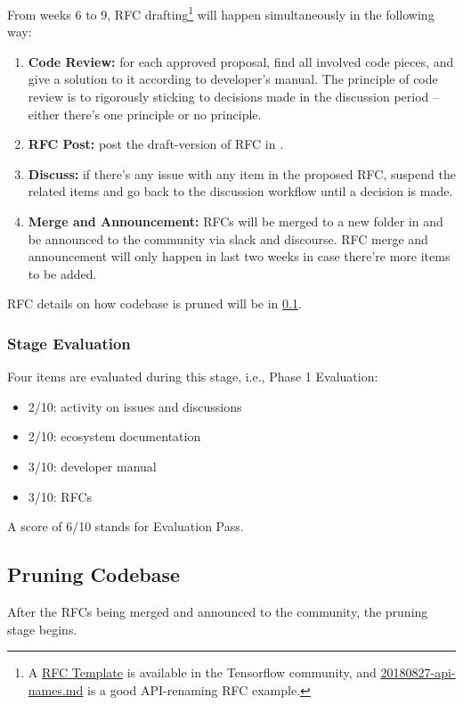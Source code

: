 From weeks 6 to 9, RFC drafting\footnote{A \href{https://github.com/tensorflow/community/blob/master/rfcs/yyyymmdd-rfc-template.md}{RFC Template} is available in the Tensorflow community, and \href{https://github.com/tensorflow/community/blob/master/rfcs/20180827-api-names.md}{20180827-api-names.md} is a good API-renaming RFC example.} will happen simultaneously in the following way:
\begin{enumerate}
    \item \textbf{Code Review:} for each approved proposal, find all involved code pieces, and give a solution to it according to developer's manual. The principle of code review is to rigorously sticking to decisions made in the discussion period -- either there's one principle or no principle.
    \item \textbf{RFC Post:} post the draft-version of RFC in \repogsoctempdoc{}.
    \item \textbf{Discuss:} if there's any issue with any item in the proposed RFC, suspend the related items and go back to the discussion workflow until a decision is made.
    \item \textbf{Merge and Announcement:} RFCs will be merged to a new folder in \repoimagesgithubio{} and be announced to the community via slack and discourse. RFC merge and announcement will only happen in last two weeks in case there're more items to be added.
\end{enumerate}
RFC details on how codebase is pruned will be in \cref{subsec:prune}.

\subsubsection*{Stage Evaluation}

Four items are evaluated during this stage, i.e., \textsf{Phase 1 Evaluation}:
\begin{itemize}
    \item 2/10: activity on issues and discussions
    \item 2/10: ecosystem documentation
    \item 3/10: developer manual
    \item 3/10: RFCs
\end{itemize}
A score of 6/10 stands for \textsf{Evaluation Pass}.

\subsection{Pruning Codebase}\label{subsec:prune}
After the RFCs being merged and announced to the community, the pruning stage begins.


